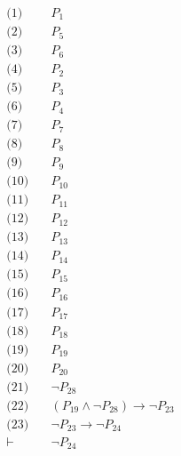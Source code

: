 \documentclass[11pt]{article}
\begin{document}
\begin{align*}
  \text{(1)} \quad & P_{1} \\
  \text{(2)} \quad & P_{5} \\
  \text{(3)} \quad & P_{6} \\
  \text{(4)} \quad & P_{2} \\
  \text{(5)} \quad & P_{3} \\
  \text{(6)} \quad & P_{4} \\
  \text{(7)} \quad & P_{7} \\
  \text{(8)} \quad & P_{8} \\
  \text{(9)} \quad & P_{9} \\
  \text{(10)} \quad & P_{10} \\
  \text{(11)} \quad & P_{11} \\
  \text{(12)} \quad & P_{12} \\
  \text{(13)} \quad & P_{13} \\
  \text{(14)} \quad & P_{14} \\
  \text{(15)} \quad & P_{15} \\
  \text{(16)} \quad & P_{16} \\
  \text{(17)} \quad & P_{17} \\
  \text{(18)} \quad & P_{18} \\
  \text{(19)} \quad & P_{19} \\
  \text{(20)} \quad & P_{20} \\
  \text{(21)} \quad & \lnot P_{28} \\
  \text{(22)} \quad & (P_{19} \land \lnot P_{28}) \rightarrow \lnot P_{23} \\
  \text{(23)} \quad & \lnot P_{23} \rightarrow \lnot P_{24} \\
  \vdash \quad & \lnot P_{24}
\end{align*}
\end{document}
